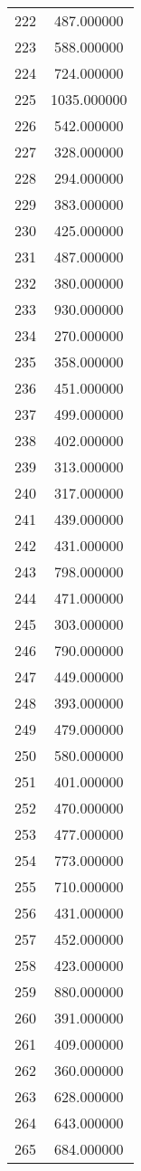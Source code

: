 \documentclass[12pt]{article}
\begin{document}
\begin{longtable}{@{}cc@{}}
222 & 487.000000 \\
223 & 588.000000 \\
224 & 724.000000 \\
225 & 1035.000000 \\
226 & 542.000000 \\
227 & 328.000000 \\
228 & 294.000000 \\
229 & 383.000000 \\
230 & 425.000000 \\
231 & 487.000000 \\
232 & 380.000000 \\
233 & 930.000000 \\
234 & 270.000000 \\
235 & 358.000000 \\
236 & 451.000000 \\
237 & 499.000000 \\
238 & 402.000000 \\
239 & 313.000000 \\
240 & 317.000000 \\
241 & 439.000000 \\
242 & 431.000000 \\
243 & 798.000000 \\
244 & 471.000000 \\
245 & 303.000000 \\
246 & 790.000000 \\
247 & 449.000000 \\
248 & 393.000000 \\
249 & 479.000000 \\
250 & 580.000000 \\
251 & 401.000000 \\
252 & 470.000000 \\
253 & 477.000000 \\
254 & 773.000000 \\
255 & 710.000000 \\
256 & 431.000000 \\
257 & 452.000000 \\
258 & 423.000000 \\
259 & 880.000000 \\
260 & 391.000000 \\
261 & 409.000000 \\
262 & 360.000000 \\
263 & 628.000000 \\
264 & 643.000000 \\
265 & 684.000000 \\

\end{longtable}
\end{document}
